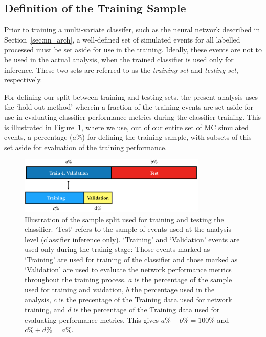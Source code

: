 \subsection{Definition of the Training Sample}
\label{sec:nn_train}

Prior to training a multi-variate classifer, such as the neural network described in Section~\ref{sec:nn_arch},
a well-defined set of simulated events for all labelled processed must be set aside for use in the training.
Ideally, these events are not to be used in the actual analysis, when the trained classifier is used only
for inference.
These two sets are referred to as the \textit{training set} and \textit{testing set}, respectively.

For defining our split between training and testing sets, the present analysis uses the `hold-out method' wherein
a fraction of the training events are set aside for use in evaluating classifier performance metrics
during the classifier training.
This is illustrated in Figure~\ref{fig:nn_sample_split}, where we use, out of our entire set of MC simulated
events, a percentage ($a\%$) for defining the training sample, with subsets of this set aside for evaluation
of the training performance.

\begin{figure}[!htb]
    \begin{center}
        \includegraphics[width=0.8\textwidth]{figures/search_hh/mva/wwbb_nn_sample_breakdown}
        \caption{
            Illustration of the sample split used for training and testing the classifier.
            `Test' refers to the sample of events used at the analysis level (classifier inference only).
            `Training' and `Validation' events are used only during the trainig stage:
            Those events marked as `Training' are used for training of the classifier and those
            marked as `Validation' are used to evaluate the network performance metrics throughout
            the training process.
            $a$ is the percentage of the sample used for training and vaidation, $b$ the percentage used
            in the analysis, $c$ is the precentage of the Training data used for network training, and $d$ is the percentage
            of the Training data used for evaluating performance metrics.
            This gives $a\% + b\% = 100\%$ and $c\% + d\% = a\%$.
        }
        \label{fig:nn_sample_split}
    \end{center}
\end{figure}

